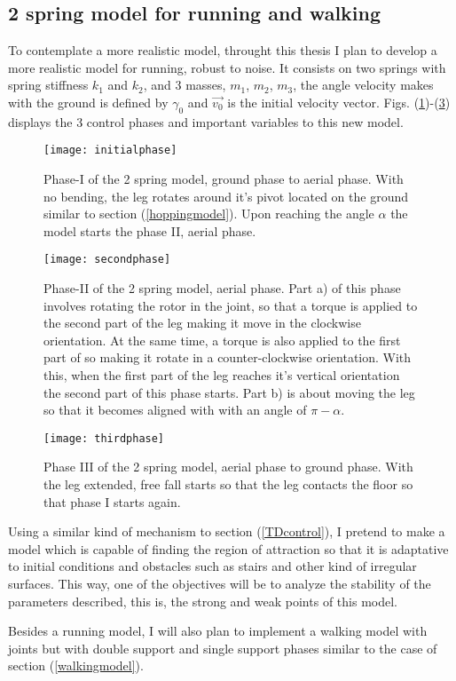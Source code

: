 \subsection{2 spring model for running and walking}\label{2springssection}
To contemplate a more realistic model, throught this thesis I plan to develop a more realistic model for running, robust to noise. It consists on two springs with spring stiffness $k_1$ and $k_2$, and 3 masses, $m_1$, $m_2$, $m_3$, the angle velocity makes with the ground is defined by $\gamma_0$ and $\vec{v_0}$ is the initial velocity vector. Figs. (\ref{2spring1})-(\ref{2spring3}) displays the 3 control phases and important variables to this new model. 

\begin{figure}[H]
   \centering
   \texttt{[image: initialphase]}
   \caption{Phase-I of the 2 spring model, ground phase to aerial phase. With no bending, the leg rotates around it's pivot located on the ground similar to section (\ref{hoppingmodel}). Upon reaching the angle $\alpha$ the model starts the phase II, aerial phase.}
   \label{2spring1}
  \end{figure}

\begin{figure}[H]
  \centering
  \texttt{[image: secondphase]}
  \caption{Phase-II of the 2 spring model, aerial phase. Part a) of this phase involves rotating the rotor in the joint, so that a torque is applied to the second part of the leg making it move in the clockwise orientation. At the same time, a torque is also applied to the first part of so making it rotate in a counter-clockwise orientation. With this, when the first part of the leg reaches it's vertical orientation the second part of this phase starts. Part b) is about moving the leg so that it becomes aligned with with an angle of $\pi-\alpha$. }
  \label{2spring2}
\end{figure}

\begin{figure}[H]
  \centering
  \texttt{[image: thirdphase]}
  \caption{Phase III of the 2 spring model, aerial phase to ground phase. With the leg extended, free fall starts so that the leg contacts the floor so that phase I starts again.}
     \label{2spring3}
  \end{figure}

Using a similar kind of mechanism to section (\ref{TDcontrol}), I pretend to make a model  which is capable of finding the region of attraction so that it is adaptative to initial conditions and obstacles such as stairs and other kind of irregular surfaces. This way, one of the objectives will be to analyze the stability of the parameters described, this is, the strong and weak points of this model.

Besides a running model, I will also plan to implement a walking model with joints but with double support and single support phases similar to the case of section (\ref{walkingmodel}). 
